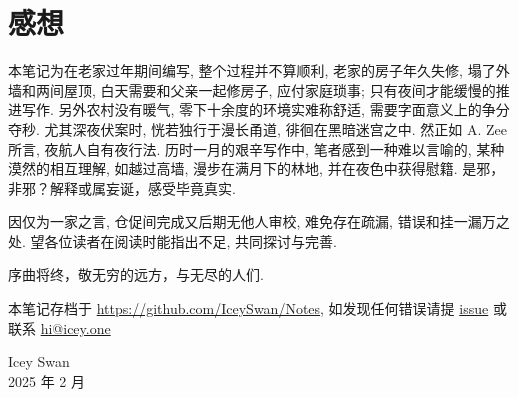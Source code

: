 \section*{感想}

本笔记为在老家过年期间编写, 整个过程并不算顺利, 老家的房子年久失修, 塌了外墙和两间屋顶, 白天需要和父亲一起修房子, 应付家庭琐事; 只有夜间才能缓慢的推进写作. 另外农村没有暖气, 零下十余度的环境实难称舒适, 需要字面意义上的争分夺秒. 尤其深夜伏案时, 恍若独行于漫长甬道, 徘徊在黑暗迷宫之中. 然正如 A. Zee 所言, 夜航人自有夜行法\cite{NightPhysics}. 历时一月的艰辛写作中, 笔者感到一种难以言喻的, 某种漠然的相互理解, 如越过高墙, 漫步在满月下的林地, 并在夜色中获得慰籍. 是邪，非邪？解释或属妄诞，感受毕竟真实. 

因仅为一家之言, 仓促间完成又后期无他人审校, 难免存在疏漏, 错误和挂一漏万之处. 望各位读者在阅读时能指出不足, 共同探讨与完善. 

序曲将终，敬无穷的远方，与无尽的人们.  


本笔记存档于 \href{https://github.com/IceySwan/Notes}{https://github.com/IceySwan/Notes}, 如发现任何错误请提 \href{https://github.com/IceySwan/Notes/issues/new}{issue} 或联系 \href{mailto:hi@icey.one}{hi@icey.one}

\begin{flushright}
    Icey Swan\\
    2025 年 2 月 %
\end{flushright}